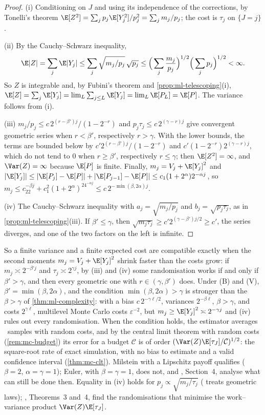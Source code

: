 \begin{proof}
(i) Conditioning on $J$ and using its independence of the corrections, by Tonelli's theorem
$\E[Z^2]=\sum_jp_j\E[Y_j^2]/p_j^2=\sum_jm_j/p_j$; the cost is $\tau_j$ on $\{J=j\}$.

(ii) By the Cauchy--Schwarz inequality,
\[
  \E|Z|=\sum_j\E|Y_j|\le\sum_j\sqrt{m_j/p_j}\,\sqrt{p_j}\le\Big(\sum_j\frac{m_j}{p_j}\Big)^{1/2}\Big(\sum_jp_j\Big)^{1/2}<\infty .
\]
So $Z$ is integrable and, by Fubini's theorem and \cref{prop:ml-telescoping}(i),
$\E[Z]=\sum_j\E[Y_j]=\lim_L\sum_{j\le L}\E[Y_j]=\lim_L\E[P_L]=\E[P]$. The variance follows from (i).

(iii) $m_j/p_j\le c\,2^{(r-\beta')j}/(1-2^{-r})$ and $p_j\tau_j\le c\,2^{(\gamma-r)j}$ give
convergent geometric series when $r<\beta'$, respectively $r>\gamma$. With the lower bounds, the
terms are bounded below by $c'2^{(r-\beta')j}/(1-2^{-r})$ and $c'(1-2^{-r})2^{(\gamma-r)j}$, which
do not tend to $0$ when $r\ge\beta'$, respectively $r\le\gamma$; then $\E[Z^2]=\infty$, and
$\Var(Z)=\infty$ because $\E[P]$ is finite. Finally,
$m_j=V_j+\E[Y_j]^2$ and $|\E[Y_j]|\le|\E[P_j]-\E[P]|+|\E[P_{j-1}]-\E[P]|\le c_1(1+2^\alpha)2^{-\alpha j}$,
so $m_j\le c_22^{-\beta j}+c_1^2(1+2^\alpha)^24^{-\alpha j}\le c\,2^{-\min(\beta,2\alpha)j}$.

(iv) The Cauchy--Schwarz inequality with $a_j=\sqrt{m_j/p_j}$ and $b_j=\sqrt{p_j\tau_j}$, as in
\cref{prop:ml-telescoping}(iii). If $\beta'\le\gamma$, then $\sqrt{m_j\tau_j}\ge c'2^{(\gamma-\beta')j/2}\ge c'$,
the series diverges, and one of the two factors on the left is infinite.
\end{proof}

So a finite variance and a finite expected cost are compatible exactly when the second moments
$m_j=V_j+\E[Y_j]^2$ shrink faster than the costs grow: if $m_j\asymp2^{-\beta'j}$ and
$\tau_j\asymp2^{\gamma j}$, by (iii) and (iv) some randomisation works if and only if $\beta'>\gamma$,
and then every geometric one with $r\in(\gamma,\beta')$ does. Under (B) and (V),
$\beta'=\min(\beta,2\alpha)$, and the condition $\min(\beta,2\alpha)>\gamma$ is stronger than the
$\beta>\gamma$ of \cref{thm:ml-complexity}: with a bias $c\,2^{-\gamma\ell/2}$, variances
$2^{-\beta\ell}$, $\beta>\gamma$, and costs $2^{\gamma\ell}$, multilevel Monte Carlo costs
$\varepsilon^{-2}$, but $m_j\ge\E[Y_j]^2\asymp2^{-\gamma j}$ and (iv) rules out every randomisation.
When the condition holds, the estimator averages \iid\ samples with random costs,
and by the central limit theorem with random costs (\cref{rem:mc-budget}) its error for a budget
$\mathcal C$ is of order $(\Var(Z)\E[\tau_J]/\mathcal C)^{1/2}$: the square-root rate of exact
simulation, with no bias to estimate and a valid confidence interval
(\cref{thm:mc-clt}). Milstein with a Lipschitz payoff qualifies ($\beta=2$, $\alpha=\gamma=1$);
Euler, with $\beta=\gamma=1$, does not, and \textcite{rhee-glynn}, Section~4, analyse what can still be done
then. Equality in (iv) holds for $p_j\propto\sqrt{m_j/\tau_j}$ ( treats
geometric laws); \textcite{rhee-glynn}, Theorems~3 and~4, find the randomisations that minimise the
work--variance product $\Var(Z)\E[\tau_J]$.

